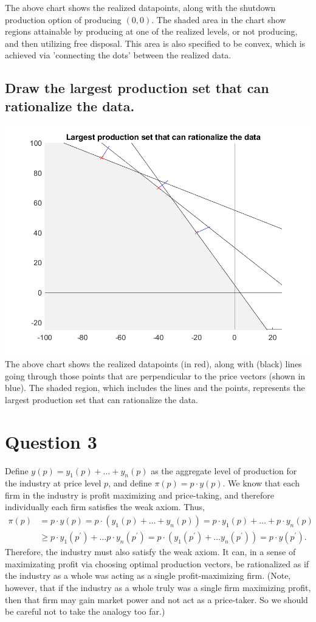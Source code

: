 \documentclass[11pt]{article} %
\begin{document}
The above chart shows the realized datapoints, along with the shutdown production option of producing $(0,0)$. The shaded area in the chart show regions attainable by producing at one of the realized levels, or not producing, and then utilizing free disposal. This area is also specified to be convex, which is achieved via 'connecting the dots' between the realized data.

\subsection{Draw the largest production set that can rationalize the data.}
\includegraphics{largestprod}
The above chart shows the realized datapoints (in red), along with (black) lines going through those points that are perpendicular to the price vectors (shown in blue). The shaded region, which includes the lines and the points, represents the largest production set that can rationalize the data.

\section{Question 3}
Define $y(p) = y_1(p) + \dots + y_n(p)$ as the aggregate level of production for the industry at price level $p$, and define $\pi (p) = p \cdot y(p)$. We know that each firm in the industry is profit maximizing and price-taking, and therefore individually each firm satisfies the weak axiom. Thus,
\begin{align*}
\pi (p) &= p \cdot y(p) = p \cdot (y_1(p) + \dots + y_n(p)) = p \cdot y_1(p) + \dots + p \cdot y_n(p) \\ &\geq p \cdot y_1(p^{'}) + \dots p \cdot y_n(p^{'}) 
= p \cdot (y_1(p^{'}) + \dots y_n(p^{'})) = p \cdot y(p^{'}).
\end{align*}
Therefore, the industry must also satisfy the weak axiom. It can, in a sense of maximizating profit via choosing optimal production vectors, be rationalized as if the industry as a whole was acting as a single profit-maximizing firm. (Note, however, that if the industry as a whole truly was a single firm maximizing profit, then that firm may gain market power and not act as a price-taker. So we should be careful not to take the analogy too far.)
\end{document}
